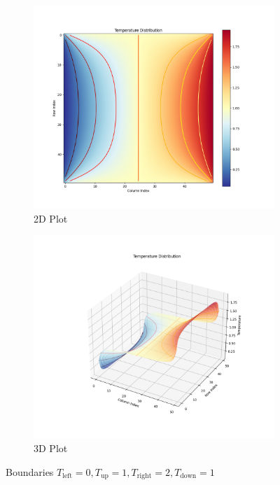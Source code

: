 \documentclass{article}
\begin{document}
\begin{figure}[H]
  \begin{subfigure}{0.45\textwidth}
    \includegraphics[width=\linewidth]{figures/Figure_5.png}
    \caption{2D Plot}
  \end{subfigure}
  \hfill
  \begin{subfigure}{0.45\textwidth}
    \includegraphics[width=\linewidth]{figures/Figure_6.png}
    \caption{3D Plot}
  \end{subfigure}
  \caption{Boundaries $T_{\text{left}}=0, T_{\text{up}}=1, T_{\text{right}}=2, T_{\text{down}}=1$}
\end{figure}
\end{document}
